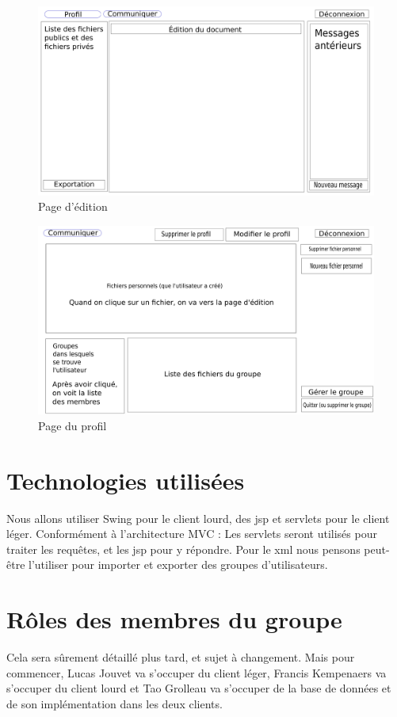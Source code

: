 \documentclass[a4paper, 12pt]{article}
\begin{document}
\begin{figure}[H]
  \begin{center}
    \includegraphics[scale=0.3]{edition.png}
  \end{center}
  \caption{Page d'édition}
\end{figure}
\begin{figure}[H]
  \begin{center}
    \includegraphics[scale=0.3]{profil.png}
  \end{center}
  \caption{Page du profil}
\end{figure}

\section{Technologies utilisées}
Nous allons utiliser Swing pour le client lourd, des jsp et servlets pour le client léger. Conformément à l'architecture MVC : Les servlets seront utilisés pour traiter les requêtes, et les jsp pour y répondre. Pour le xml nous pensons peut-être l'utiliser pour importer et exporter des groupes d'utilisateurs.
\section{Rôles des membres du groupe}

Cela sera sûrement détaillé plus tard, et sujet à changement.
Mais pour commencer, Lucas Jouvet va s'occuper du client léger, Francis Kempenaers va s'occuper du client lourd et Tao Grolleau va s'occuper de la base de données et de son implémentation dans les deux clients.
\end{document}
